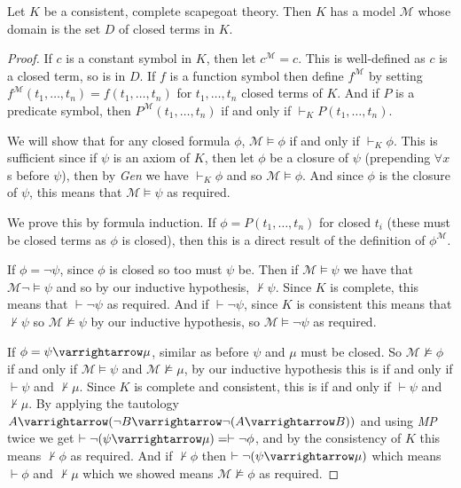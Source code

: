 \documentclass[10pt]{article}
\let\to=\varrightarrow
\def\MP{\textit{MP}} \def\Gen{\textit{Gen}}
\def\mM{\mathcal{M}}
\begin{document}
\begin{lemm*}

    Let $K$ be a consistent, complete scapegoat theory.
    Then $K$ has a model $\mM$ whose domain is the set $D$ of closed terms in $K$.

\end{lemm*}

\begin{proof}

    If $c$ is a constant symbol in $K$, then let $c^\mM=c$.
    This is well-defined as $c$ is a closed term, so is in $D$.
    If $f$ is a function symbol then define $f^\mM$ by setting $f^\mM(t_1,\dots,t_n)=f(t_1,\dots,t_n)$ for $t_1,\dots,t_n$ closed terms of $K$.
    And if $P$ is a predicate symbol, then $P^\mM(t_1,\dots,t_n)$ if and only if $\vdash_K P(t_1,\dots,t_n)$.

    We will show that for any closed formula $\phi$, $\mM\vDash\phi$ if and only if $\vdash_K\phi$.
    This is sufficient since if $\psi$ is an axiom of $K$, then let $\phi$ be a closure of $\psi$ (prepending $\forall x$s before $\psi$), then by \Gen{} we have $\vdash_K\phi$ and so $\mM\vDash\phi$.
    And since $\phi$ is the closure of $\psi$, this means that $\mM\vDash\psi$ as required.

    We prove this by formula induction.
    If $\phi=P(t_1,\dots,t_n)$ for closed $t_i$ (these must be closed terms as $\phi$ is closed), then this is a direct result of the definition of $\phi^\mM$.

    If $\phi=\neg\psi$, since $\phi$ is closed so too must $\psi$ be.
    Then if $\mM\vDash\psi$ we have that $\mM\neg\vDash\psi$ and so by our inductive hypothesis, $\nvdash\psi$.
    Since $K$ is complete, this means that $\vdash\neg\psi$ as required.
    And if $\vdash\neg\psi$, since $K$ is consistent this means that $\nvdash\psi$ so $\mM\nvDash\psi$ by our inductive hypothesis, so $\mM\vDash\neg\psi$ as required.

    If $\phi=\psi\to\mu$, similar as before $\psi$ and $\mu$ must be closed.
    So $\mM\nvDash\phi$ if and only if $\mM\vDash\psi$ and $\mM\nvDash\mu$, by our inductive hypothesis this is if and only if $\vdash\psi$ and $\nvdash\mu$.
    Since $K$ is complete and consistent, this is if and only if $\vdash\psi$ and $\nvdash\mu$.
    By applying the tautology $A\to(\neg B\to\neg(A\to B))$ and using \MP{} twice we get $\vdash\neg(\psi\to\mu)=\vdash\neg\phi$, and by the consistency of $K$ this means $\nvdash\phi$ as required.
    And if $\nvdash\phi$ then $\vdash\neg(\psi\to\mu)$ which means $\vdash\phi$ and $\nvdash\mu$ which we showed means $\mM\nvDash\phi$ as required.


\end{proof}
\end{document}
